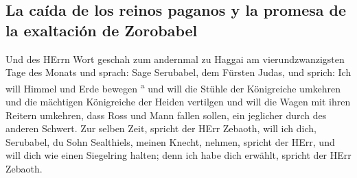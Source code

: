 \hypertarget{la-cauxedda-de-los-reinos-paganos-y-la-promesa-de-la-exaltaciuxf3n-de-zorobabel}{%
\subsection{La caída de los reinos paganos y la promesa de la exaltación
de
Zorobabel}\label{la-cauxedda-de-los-reinos-paganos-y-la-promesa-de-la-exaltaciuxf3n-de-zorobabel}}

 Und des HErrn Wort geschah zum andernmal zu Haggai am
vierundzwanzigsten Tage des Monats und sprach:  Sage
Serubabel, dem Fürsten Judas, und sprich: Ich will Himmel und Erde
bewegen \textsuperscript{a}  und will die Stühle der
Königreiche umkehren und die mächtigen Königreiche der Heiden vertilgen
und will die Wagen mit ihren Reitern umkehren, dass Ross und Mann fallen
sollen, ein jeglicher durch des anderen Schwert.  Zur
selben Zeit, spricht der HErr Zebaoth, will ich dich, Serubabel, du Sohn
Sealthiels, meinen Knecht, nehmen, spricht der HErr, und will dich wie
einen Siegelring halten; denn ich habe dich erwählt, spricht der HErr
Zebaoth.
